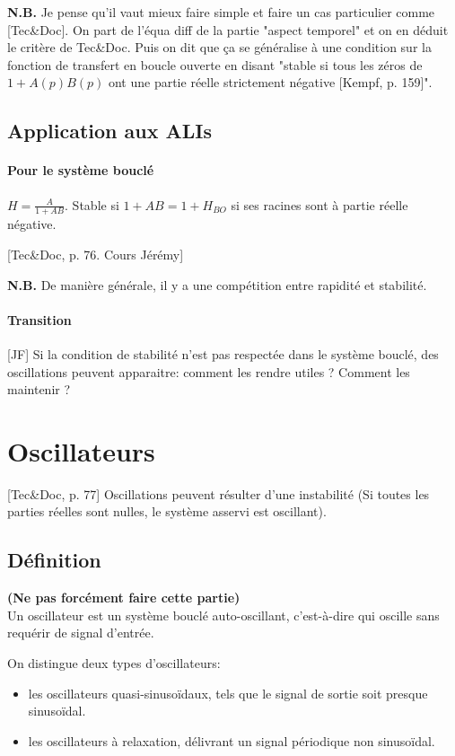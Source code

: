 \documentclass[11pt]{report}
\numberwithin{figure}{section}
\numberwithin{equation}{section}
\numberwithin{table}{section}
\newcommand{\1}{\boldsymbol{1}}
\begin{document}
\textbf{N.B.} Je pense qu'il vaut mieux faire simple et faire un cas particulier comme [Tec\&Doc]. On part de l'équa diff de la partie "aspect temporel" et on en déduit le critère de Tec\&Doc. Puis on dit que ça se généralise à une condition sur la fonction de transfert en boucle ouverte en disant "stable si tous les zéros de $1 + A(p) B(p)$ ont une partie réelle strictement négative [Kempf, p. 159]".

\subsection{Application aux ALIs}

\paragraph{Pour le système bouclé} $H = \frac{A}{1+AB}$. Stable si $1+AB = 1+H_{BO}$ si ses racines sont à partie réelle négative.

[Tec\&Doc, p. 76. Cours Jérémy]

\textbf{N.B.} De manière générale, il y a une compétition entre rapidité et stabilité.


\paragraph{Transition} [JF] Si la condition de stabilité n'est pas respectée dans le système bouclé, des oscillations peuvent apparaitre: comment les rendre utiles ? Comment les maintenir ?

\section{Oscillateurs}

[Tec\&Doc, p. 77] Oscillations peuvent résulter d'une instabilité (Si toutes les parties réelles sont nulles, le système asservi est oscillant).

\subsection{Définition}

\textbf{(Ne pas forcément faire cette partie)} \\

Un oscillateur est un système bouclé auto-oscillant, c'est-à-dire qui oscille sans requérir de signal d'entrée.

On distingue deux types d'oscillateurs:
\begin{itemize}
\item les oscillateurs quasi-sinusoïdaux, tels que le signal de sortie soit presque sinusoïdal.

\item les oscillateurs à relaxation, délivrant un signal périodique non sinusoïdal.
\end{itemize}
\end{document}
